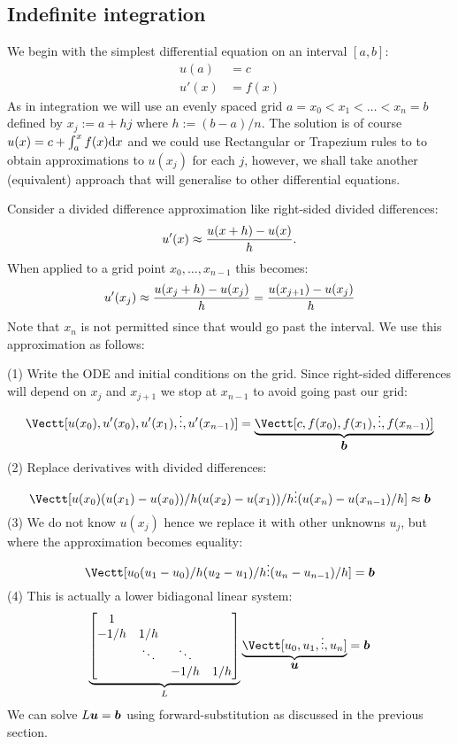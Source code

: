 \subsection{Indefinite integration}
We begin with the simplest differential equation on an interval $[a,b]$:
\begin{align*}
u(a) &= c \\
u'(x) &= f(x)
\end{align*}
As in integration we will use an evenly spaced grid $a = x_0 < x_1 < \ensuremath{\ldots} < x_n = b$ defined by $x_j :=  a + h j$ where $h := (b-a)/n$. The solution is of course $u(x) = c + \ensuremath{\int}_a^x f(x) {\rm d}x$ and we could use Rectangular or Trapezium rules to to obtain approximations to $u(x_j)$ for each $j$, however, we shall take another (equivalent) approach that will generalise to other differential equations. 

Consider a divided difference approximation like right-sided divided differences: 
\[
u'(x) \ensuremath{\approx} {u(x+h) - u(x)\over h}.
\]
When applied to a grid point $x_0,\ensuremath{\ldots},x_{n-1}$ this becomes:
\[
u'(x_j) \ensuremath{\approx} {u(x_j+h) - u(x_j)\over h} = {u(x_{j+1}) - u(x_j)\over h}
\]
Note that $x_n$ is not permitted since that would go past the interval. We use this approximation as follows:

(1) Write the ODE and initial conditions on the grid. Since right-sided differences will depend on $x_j$ and $x_{j+1}$ we stop at $x_{n-1}$ to avoid going past our grid: 
\[
\Vectt[u(x_0) , 
     u'(x_0) ,
u'(x_1) ,
\ensuremath{\vdots} ,
u'(x_{n-1})] = \underbrace{\Vectt[c, f(x_0), f(x_1), \ensuremath{\vdots} , f(x_{n-1})]}_{\ensuremath{\bm{\b}}}
\]
(2) Replace derivatives with divided differences:
\[
\Vectt[u(x_0) \\ 
(u(x_1) - u(x_0))/h \\
(u(x_2) - u(x_1))/h \\
\ensuremath{\vdots} \\
(u(x_n) - u(x_{n-1})/h] \ensuremath{\approx} \ensuremath{\bm{\b}}
\]
(3) We do not know $u(x_j)$ hence we replace it with other unknowns $u_j$, but where the approximation becomes equality:
\[
\Vectt[u_0 \\ 
(u_1 - u_0)/h \\
(u_2 - u_1)/h \\
\ensuremath{\vdots} \\
(u_n - u_{n-1})/h] = \ensuremath{\bm{\b}}
\]
(4) This is actually a lower bidiagonal linear system:
\[
\underbrace{\begin{bmatrix}
    1 \\ 
    -1/h & 1/h \\
    & \ensuremath{\ddots} & \ensuremath{\ddots} \\
    && -1/h & 1/h \end{bmatrix}}_L \underbrace{\Vectt[u_0,u_1,\ensuremath{\vdots},u_n]}_{\ensuremath{\bm{\u}}} = \ensuremath{\bm{\b}}
\]
We can solve $L \bm{{\mbox{\boldmath$u$\unboldmath}}} = \bm{{\mbox{\boldmath$b$\unboldmath}}}$ using forward-substitution as discussed in the previous section.

